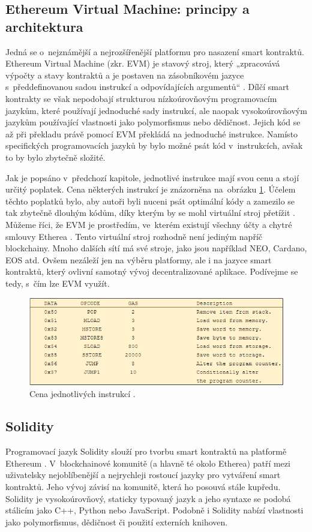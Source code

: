 \subsection{Ethereum Virtual Machine: principy a architektura}
Jedná se o~nejznámější a nejrozšířenější platformu pro nasazení smart kontraktů. Ethereum Virtual Machine (zkr. EVM) je stavový stroj, který „zpracovává výpočty a stavy kontraktů a je postaven na zásobníkovém jazyce s~předdefinovanou sadou instrukcí a odpovídajících argumentů“ \cite{WohrerZdun}. Dílčí smart kontrakty se však nepodobají strukturou nízkoúrovňovým programovacím jazykům, které používají jednoduché sady instrukcí, ale naopak vysokoúrovňovým jazykům používající vlastnosti jako polymorfismus nebo dědičnost. Jejich kód se až při překladu právě pomocí EVM překládá na jednoduché instrukce. Namísto specifických programovacích jazyků by bylo možné psát kód v~instrukcích, avšak to by bylo zbytečně složité. 

Jak je popsáno v~předchozí kapitole, jednotlivé instrukce mají svou cenu a stojí určitý poplatek. Cena některých instrukcí je znázorněna na~obrázku \ref{fig:instrukce}. Účelem těchto poplatků bylo, aby autoři byli nuceni psát optimální kódy a zamezilo se tak zbytečně dlouhým kódům, díky kterým by se mohl virtuální stroj přetížit \cite{WohrerZdun}. Můžeme říci, že EVM je prostředím, ve~kterém existují všechny účty a chytré smlouvy Etherea \cite{evm}. Tento virtuální stroj rozhodně není jediným napříč blockchainy. Mnoho dalších sítí má své stroje, jako jsou například NEO, Cardano, EOS atd. Ovšem nezáleží jen na výběru platformy, ale i na jazyce smart kontraktů, který ovlivní samotný vývoj decentralizované aplikace. Podívejme se tedy, s~čím lze EVM využít. 

\begin{figure}
\centering
\includegraphics[width=\textwidth]{obrazky/instrukce.png}
\caption{Cena jednotlivých instrukcí \cite{yellowpaper}.}
\label{fig:instrukce}
\centering
\end{figure}

\subsection{Solidity}
Programovací jazyk Solidity slouží pro tvorbu smart kontraktů na platformě Ethereum \cite{solidity1}. V~blockchainové komunitě (a hlavně té okolo Etherea) patří mezi uživatelsky nejoblíbenější a nejrychleji rostoucí jazyky pro vytváření smart kontraktů. Jeho vývoj závisí na komunitě, která ho posouvá stále kupředu. Solidity je vysokoúrovňový, staticky typovaný jazyk a jeho syntaxe se podobá stálicím jako C++, Python nebo JavaScript. Podobně i Solidity nabízí vlastnosti jako polymorfismus, dědičnost či použití externích knihoven. 

